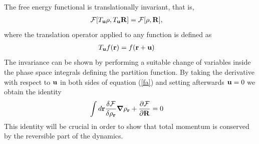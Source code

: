 \documentclass[b5paper,openright,10pt]{book}
\begin{document}
The free energy functional is translationally invariant, that is,
\begin{align}
  {\cal F}[T_{\bf u}\rho,T_{\bf u}{\bf R}]&=  {\cal F}[\rho,{\bf R}],
\label{fa}
\end{align}
where the translation operator applied to any function is defined as
\begin{align}
  T_{\bf u}f({\bf r})&=f({\bf r}+{\bf u})
\end{align}
The  invariance  can be  shown  by  performing  a suitable  change  of
variables  inside the  phase space  integrals defining  the partition
function.  By taking the derivative with  respect to ${\bf u}$ in both
sides of equation  (\ref{fa}) and  setting afterwards ${\bf u}=0$ we obtain
the identity
\begin{align}
  \int d{\bf r}\frac{\delta {\cal F}}{\delta \rho_{\bf r}}
\boldsymbol{\nabla}\rho_{\bf r}&+\frac{\partial {\cal F}}{\partial {\bf R}}=0
\label{iden1}
\end{align}
This  identity will be  crucial in  order to  show that  total  momentum is
conserved by  the reversible part  of the dynamics.  
\end{document}

